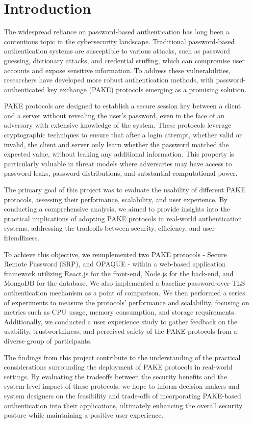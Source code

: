 \section{Introduction}
\label{sec:intro}

The widespread reliance on password-based authentication has long been a contentious topic in the cybersecurity landscape. Traditional password-based authentication systems are susceptible to various attacks, such as password guessing, dictionary attacks, and credential stuffing, which can compromise user accounts and expose sensitive information. To address these vulnerabilities, researchers have developed more robust authentication methods, with password-authenticated key exchange (PAKE) protocols emerging as a promising solution.

PAKE protocols are designed to establish a secure session key between a client and a server without revealing the user's password, even in the face of an adversary with extensive knowledge of the system. These protocols leverage cryptographic techniques to ensure that after a login attempt, whether valid or invalid, the client and server only learn whether the password matched the expected value, without leaking any additional information. This property is particularly valuable in threat models where adversaries may have access to password leaks, password distributions, and substantial computational power.

The primary goal of this project was to evaluate the usability of different PAKE protocols, assessing their performance, scalability, and user experience. By conducting a comprehensive analysis, we aimed to provide insights into the practical implications of adopting PAKE protocols in real-world authentication systems, addressing the tradeoffs between security, efficiency, and user-friendliness.

To achieve this objective, we reimplemented two PAKE protocols - Secure Remote Password (SRP), and OPAQUE - within a web-based application framework utilizing React.js for the front-end, Node.js for the back-end, and MongoDB for the database. We also implemented a baseline password-over-TLS authentication mechanism as a point of comparison. We then performed a series of experiments to measure the protocols' performance and scalability, focusing on metrics such as CPU usage, memory consumption, and storage requirements. Additionally, we conducted a user experience study to gather feedback on the usability, trustworthiness, and perceived safety of the PAKE protocols from a diverse group of participants.

The findings from this project contribute to the understanding of the practical considerations surrounding the deployment of PAKE protocols in real-world settings. By evaluating the tradeoffs between the security benefits and the system-level impact of these protocols, we hope to inform decision-makers and system designers on the feasibility and trade-offs of incorporating PAKE-based authentication into their applications, ultimately enhancing the overall security posture while maintaining a positive user experience.